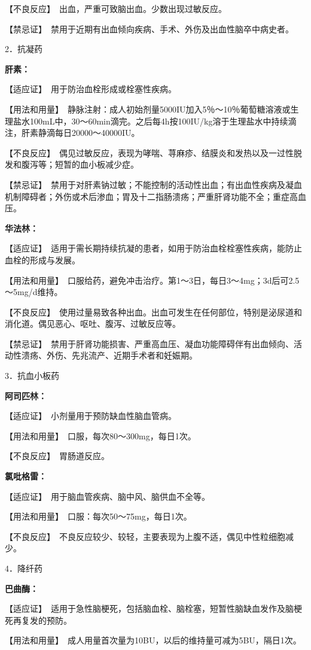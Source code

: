 【不良反应】　出血，严重可致脑出血。少数出现过敏反应。

【禁忌证】　禁用于近期有出血倾向疾病、手术、外伤及出血性脑卒中病史者。

2．抗凝药

\textbf{肝素：}

【适应证】　用于防治血栓形成或栓塞性疾病。

【用法和用量】　静脉注射：成人初始剂量5000IU加入5％～10％葡萄糖溶液或生理盐水100mL中，30～60min滴完。之后每4h按100IU/kg溶于生理盐水中持续滴注，肝素静滴每日20000～40000IU。

【不良反应】　偶见过敏反应，表现为哮喘、荨麻疹、结膜炎和发热以及一过性脱发和腹泻等；短暂的血小板减少症。

【禁忌证】　禁用于对肝素钠过敏；不能控制的活动性出血；有出血性疾病及凝血机制障碍者；外伤或术后渗血；胃及十二指肠溃疡；严重肝肾功能不全；重症高血压。

\textbf{华法林：}

【适应证】　适用于需长期持续抗凝的患者，如用于防治血栓栓塞性疾病，能防止血栓的形成与发展。

【用法和用量】　口服给药，避免冲击治疗。第1～3日，每日3～4mg；3d后可2.5～5mg/d维持。

【不良反应】　使用过量易致各种出血。出血可发生在任何部位，特别是泌尿道和消化道。偶见恶心、呕吐、腹泻、过敏反应等。

【禁忌证】　禁用于肝肾功能损害、严重高血压、凝血功能障碍伴有出血倾向、活动性溃疡、外伤、先兆流产、近期手术者和妊娠期。

3．抗血小板药

\textbf{阿司匹林：}

【适应证】　小剂量用于预防缺血性脑血管病。

【用法和用量】　口服，每次80～300mg，每日1次。

【不良反应】　胃肠道反应。

\textbf{氯吡格雷：}

【适应证】　用于脑血管疾病、脑中风、脑供血不全等。

【用法和用量】　口服：每次50～75mg，每日1次。

【不良反应】　不良反应较少、较轻，主要表现为上腹不适，偶见中性粒细胞减少。

4．降纤药

\textbf{巴曲酶：}

【适应证】　适用于急性脑梗死，包括脑血栓、脑栓塞，短暂性脑缺血发作及脑梗死再复发的预防。

【用法和用量】　成人用量首次量为10BU，以后的维持量可减为5BU，隔日1次。

